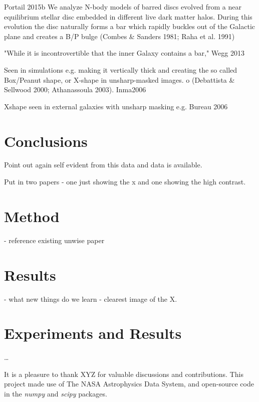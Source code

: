 \documentclass[12pt, preprint]{aastex}
\newcommand{\project}[1]{\textsl{#1}}
\begin{document}
Portail 2015b We analyze N-body models of barred discs evolved from a near
equilibrium stellar disc embedded in different live dark matter halos.
During this evolution the disc naturally forms a bar which
rapidly buckles out of the Galactic plane and creates a B/P bulge
(Combes & Sanders 1981; Raha et al. 1991)

"While it is incontrovertible that the inner Galaxy contains a bar," Wegg 2013

Seen in simulations e.g. making it vertically thick and creating the so
called Box/Peanut shape, or X-shape in unsharp-masked images.
o (Debattista & Sellwood 2000; Athanassoula
2003). Inma2006

Xshape seen in external galaxies with unsharp masking e.g. Bureau 2006

\section {Conclusions} 

Point out again self evident from this data and data is available. 

Put in two papers - one just showing the x and one showing the high contrast. 


\section{Method}
- reference existing unwise paper 

\section{Results}  
- what new things do we learn 
- clearest image of the X. 


\section{Experiments and Results}

\ldots 

\acknowledgments
It is a pleasure to thank
XYZ
for valuable discussions and contributions.
This project made use of
  The NASA Astrophysics Data System,
  and open-source code in the \project{numpy} and \project{scipy} packages.
\end{document}
